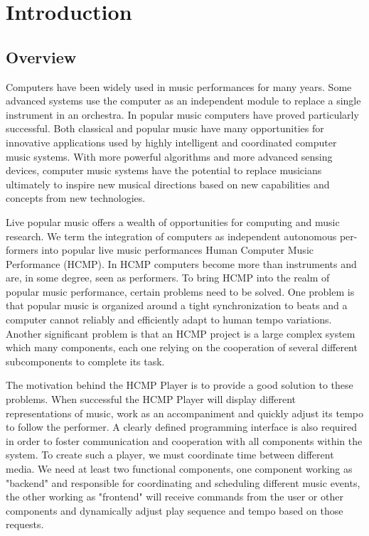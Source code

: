 \chapter{Introduction}

\ifpdf
    \graphicspath{{1_introduction/figures/PNG/}{1_introduction/figures/PDF/}{1_introduction/figures/}}
\else
    \graphicspath{{1_introduction/figures/EPS/}{1_introduction/figures/}}
\fi

\section{Overview}
Computers have been widely used in music performances for many years. Some
advanced systems use the computer as an independent module to replace a
single instrument in an orchestra. In popular music computers have proved
particularly successful. Both classical and popular music have many
opportunities for innovative applications used by highly intelligent and
coordinated computer music systems. With more powerful algorithms and more
advanced sensing devices, computer music systems have the potential to
replace musicians ultimately to inspire new musical directions based on new
capabilities and concepts from new technologies.

Live popular music offers a wealth of opportunities for computing and music
research.  We term the integration of computers  as independent autonomous
per- formers into popular live music performances Human Computer Music
Performance (HCMP). In HCMP computers become more than instruments and are,
in some degree, seen as performers. To bring HCMP into the realm of popular
music performance, certain problems need to be solved. One problem is that
popular music is organized around a tight synchronization to beats and a
computer cannot reliably and efficiently adapt to human tempo variations.
Another significant problem is that an HCMP project is a large complex
system which many components, each one relying on the cooperation of several
different subcomponents to complete its task.

The motivation behind the HCMP Player is to provide a good solution to these
problems. When successful the HCMP Player will display different
representations of music, work as an accompaniment  and quickly adjust its
tempo to follow the performer. A clearly defined programming interface is
also required in order to foster communication and cooperation with all
components within the system. To create such a player, we must coordinate
time between different media. We need at least two functional components,
one component working as "backend" and responsible for coordinating and
scheduling different music events, the other working as "frontend" will
receive commands from the user or other components and dynamically adjust
play sequence and tempo based on those requests.

